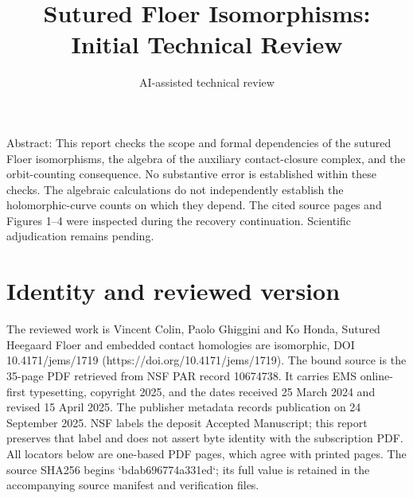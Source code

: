 \documentclass[10pt]{article}
\title{Sutured Floer Isomorphisms: Initial Technical Review}
\author{AI-assisted technical review}
\date{}
\begin{document}
\maketitle
Abstract: This report checks the scope and formal dependencies of the sutured Floer isomorphisms, the algebra of the auxiliary contact-closure complex, and the orbit-counting consequence. No substantive error is established within these checks. The algebraic calculations do not independently establish the holomorphic-curve counts on which they depend. The cited source pages and Figures 1–4 were inspected during the recovery continuation. Scientific adjudication remains pending.\par
\section*{Identity and reviewed version}
The reviewed work is Vincent Colin, Paolo Ghiggini and Ko Honda, Sutured Heegaard Floer and embedded contact homologies are isomorphic, DOI 10.4171/jems/1719 (https://doi.org/10.4171/jems/1719). The bound source is the 35-page PDF retrieved from NSF PAR record 10674738. It carries EMS online-first typesetting, copyright 2025, and the dates received 25 March 2024 and revised 15 April 2025. The publisher metadata records publication on 24 September 2025. NSF labels the deposit Accepted Manuscript; this report preserves that label and does not assert byte identity with the subscription PDF. All locators below are one-based PDF pages, which agree with printed pages. The source SHA256 begins `bdab696774a331ed`; its full value is retained in the accompanying source manifest and verification files.\par
\end{document}
